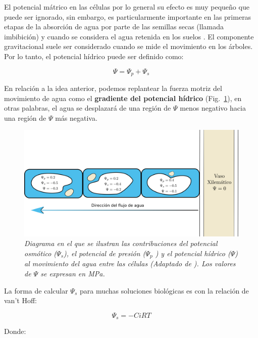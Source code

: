 El potencial m\'atrico en las c\'elulas por lo general su efecto es muy peque\~no que puede ser ignorado, sin embargo, es particularmente importante en las primeras etapas de la absorción de agua por parte de las semillas secas (llamada imbibici\'on) y cuando se considera el agua retenida en los suelos \citep{hopkins2009introduction}. El componente gravitacional suele ser considerado cuando se mide el movimiento en los \'arboles. Por lo tanto, el potencial h\'idrico puede ser definido como: 

$$\Psi = \Psi_p + \Psi_s$$

En relaci\'on a la idea anterior, podemos replantear la fuerza motriz del movimiento de agua como el \textbf{gradiente del potencial h\'idrico} (Fig.~\ref{fig:gradiente}), en otras palabras, el agua se desplazar\'a de una regi\'on de $\Psi$ menos negativo hacia una regi\'on de $\Psi$ m\'as negativa. 

\begin{figure}[h]
	\begin{leftbar}
	
	\includegraphics[width=\textwidth]{Gradiente_potencial}
	\centering
	\caption{\textit{Diagrama en el que se ilustran las contribuciones del potencial osmótico ($\Psi_s$), el potencial de presión ($\Psi_p$ ) y el potencial hídrico ($\Psi$) al movimiento del agua entre las células (Adaptado de \citealt{hopkins2009introduction}). Los valores de $\Psi$ se expresan en MPa.}}
	\label{fig:gradiente}
	
	\end{leftbar}
	
\end{figure}

La forma de calcular $\Psi_s$ para muchas soluciones biol\'ogicas es con la relaci\'on de van't Hoff:

$$ \Psi_s = -C i R T$$

Donde:

